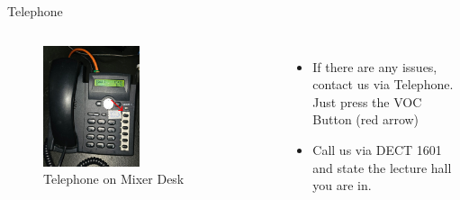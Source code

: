 
\begin{frame}{Telephone}
	\begin{columns}[T,onlytextwidth]
		\begin{figure}
			\centering
			\includegraphics[width=0.5\textwidth]{images/telephone.png}
			\caption{Telephone on Mixer Desk}
		\end{figure}
		\begin{itemize}
		\item If there are any issues, contact us via Telephone. Just press the VOC Button (red arrow)
		\item Call us via DECT 1601 and state the lecture hall you are in.
		\end{itemize}

	\end{columns}
\end{frame}

